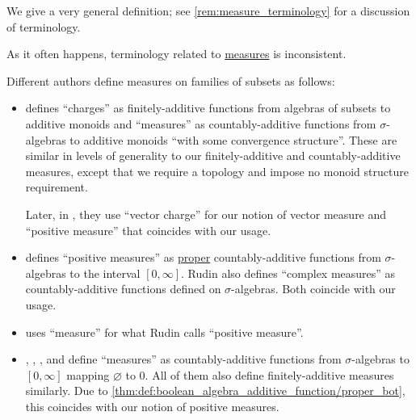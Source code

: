 \begin{comments}
  \item We give a very general definition; see \cref{rem:measure_terminology} for a discussion of terminology.
\end{comments}

\begin{remark}\label{rem:measure_terminology}
  As it often happens, terminology related to \hyperref[def:measure]{measures} is inconsistent.

  Different authors define measures on families of subsets as follows:
  \begin{itemize}
    \item \Textcite[\S 11.37]{Schechter1997AnalysisHandbook} defines \enquote{charges} as finitely-additive functions from algebras of subsets to additive monoids and \enquote{measures} as countably-additive functions from \( \sigma \)-algebras to additive monoids \enquote{with some convergence structure}. These are similar in levels of generality to our finitely-additive and countably-additive measures, except that we require a topology and impose no monoid structure requirement.

    Later, in \cite[\S 11.41]{Schechter1997AnalysisHandbook}, they use \enquote{vector charge} for our notion of vector measure and \enquote{positive measure} that coincides with our usage.

    \item \Textcite[def. 1.18(a)]{Rudin1987RealAndComplexAnalysis} defines \enquote{positive measures} as \hyperref[def:effective_domain]{proper} countably-additive functions from \( \sigma \)-algebras to the interval \( [0, \infty] \). Rudin also defines \enquote{complex measures} as countably-additive functions defined on \( \sigma \)-algebras. Both coincide with our usage.

    \item \Textcite[238]{WheedenZygmund2015MeasureAndIntegral} uses \enquote{measure} for what Rudin calls \enquote{positive measure}.

    \item \Textcite[def. 1.6.1]{Богачёв2003ОсновыТеорииМерыТом1}, \textcite[7]{Cohn2013MeasureTheory}, \textcite[24]{Folland1999RealAnalysis}, \textcite[14]{Çinlar2011ProbabilityAndStochastics} and \textcite[def. 1.4.27]{Tao2011MeasureTheory} define \enquote{measures} as countably-additive functions from \( \sigma \)-algebras to \( [0, \infty] \) mapping \( \varnothing \) to \( 0 \). All of them also define finitely-additive measures similarly. Due to \cref{thm:def:boolean_algebra_additive_function/proper_bot}, this coincides with our notion of positive measures.


\end{itemize}
\end{remark}
